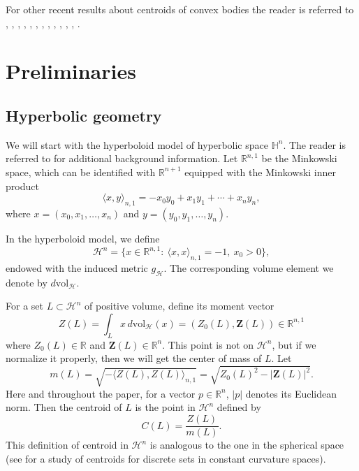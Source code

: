\documentclass[12pt,letterpaper,reqno]{amsart}
\newcommand{\ip}[2]{\langle #1,#2\rangle}
\theoremstyle{definition}
\begin{document}
For other recent results about centroids of convex bodies the reader is referred to \cite{BHLL}, \cite{BHPS},  \cite{Fr}, \cite{FMY}, \cite{LY}, \cite{MNRY},  \cite{MSZ}, \cite{MTY1}, \cite{NRY}, \cite{PTW}, \cite{ShY},  \cite{SY}, \cite{SZ}.


 
 

\section{Preliminaries}


\subsection{Hyperbolic geometry}
We will start with the hyperboloid model of hyperbolic space $\mathbb H^n$. The reader is referred to \cite{R} for additional background information. Let $\mathbb R^{n,1}$ be the Minkowski space, which can be identified with $\mathbb R^{n+1}$ equipped with the Minkowski inner product
\[
\langle x, y\rangle_{n,1} =-x_0y_0+x_1y_1+\cdots+x_ny_n,
\]
where $x=(x_0,x_1, \ldots, x_n)$ and $y=(y_0,y_1, \ldots, y_n)$.

In the hyperboloid model, we define 
\[
\mathcal{H}^n=\{x\in\mathbb R^{n,1}:\ \langle x, x\rangle_{n,1}=-1,\ x_0>0\},
\]
endowed with the induced metric $g_{\mathcal{H}}$. The corresponding volume element we denote by $ d\mathrm{vol}_{\mathcal{H}}$.


For a  set $L\subset\mathcal{H}^n$ of positive volume, 
define its moment vector
\begin{equation}\label{eq:Z-def}
	Z(L)=\int_{L} x\, d\mathrm{vol}_{\mathcal{H}}(x) = (Z_0(L),\bm{Z}(L))
	 \in\mathbb R^{n,1}
\end{equation}
where $Z_0(L) \in \mathbb{R}$ and $\bm{Z}(L) \in \mathbb{R}^n$.
This point is not on $\mathcal H^n$, but if we normalize it properly, then we will get the center of mass of $L$. 
Let
\begin{equation}\label{eq:m-def}
	m(L)=\sqrt{-\ip{Z(L)}{Z(L)}_{n,1}}
	=\sqrt{Z_0(L)^2-|\bm{Z}(L)|^2}.
\end{equation}
Here and throughout the paper, for a vector $p \in \mathbb R^n$,   $|p|$   denotes its Euclidean norm.
Then   the centroid of $L$ is the point in $\mathcal{H}^n$ defined by
\begin{equation}\label{eq:C-on-H}
	C(L)=\frac{Z(L)}{m(L)}.
\end{equation}
This definition of centroid in $\mathcal{H}^n$ is analogous to the one in the spherical space (see \cite{Ga} for a study of centroids for discrete sets in constant curvature spaces). 
\end{document}
